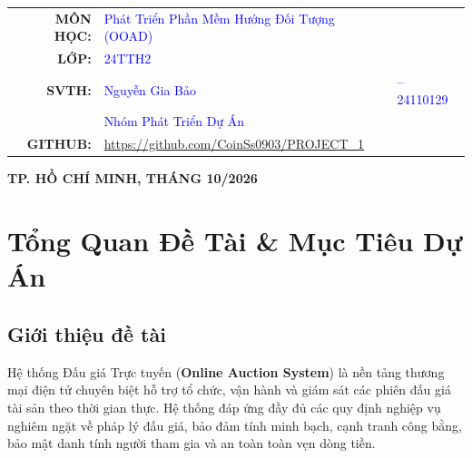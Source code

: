 \documentclass[a4paper]{article}
\begin{document}
\begin{titlepage}
	\vspace{1cm}
		
	\begin{center}
	\renewcommand{\arraystretch}{1.3}
	\begin{tabular}{rll}
		\textbf{\large MÔN HỌC:} & \large\textcolor{blue}{Phát Triển Phần Mềm Hướng Đối Tượng (OOAD)} & \\
		\textbf{\large LỚP:} & \large\textcolor{blue}{24TTH2} & \\
		\textbf{\large SVTH:} & \large\textcolor{blue}{Nguyễn Gia Bảo} & \large\textcolor{blue}{-- 24110129} \\
		& \large\textcolor{blue}{Nhóm Phát Triển Dự Án} & \\
		\textbf{\large GITHUB:} & \multicolumn{2}{l}{\large\textcolor{blue}{\url{https://github.com/CoinSs0903/PROJECT_1}}} \\
	\end{tabular}
	\end{center}
	
	\vfill
	\begin{center}
		\textbf{{\large TP. HỒ CHÍ MINH, THÁNG 10/2026}}\\
	\end{center}
\end{titlepage}

\tableofcontents
\newpage
\pagestyle{fancy}


\section{Tổng Quan Đề Tài \& Mục Tiêu Dự Án}

\subsection{Giới thiệu đề tài}
Hệ thống Đấu giá Trực tuyến (\textbf{Online Auction System}) là nền tảng thương mại điện tử chuyên biệt hỗ trợ tổ chức, vận hành và giám sát các phiên đấu giá tài sản theo thời gian thực. Hệ thống đáp ứng đầy đủ các quy định nghiệp vụ nghiêm ngặt về pháp lý đấu giá, bảo đảm tính minh bạch, cạnh tranh công bằng, bảo mật danh tính người tham gia và an toàn toàn vẹn dòng tiền.
\end{document}
